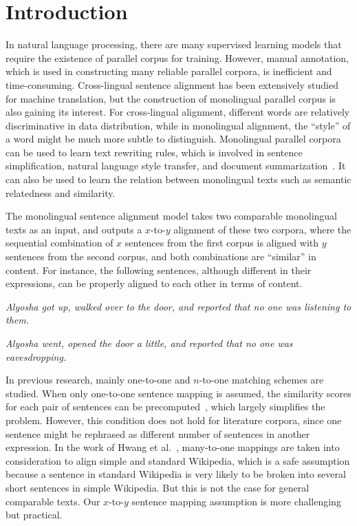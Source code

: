 \section{Introduction}
\label{sec:intro}

In natural language processing, there are many supervised learning models that require the existence of parallel corpus for training. However, manual annotation, which is used in constructing many reliable parallel corpora, is inefficient and time-consuming. Cross-lingual sentence alignment has been extensively studied for machine translation, but the construction of monolingual parallel corpus is also gaining its interest. For cross-lingual alignment, different words are relatively discriminative in data distribution, while in monolingual alignment, the ``style'' of a word might be much more subtle to distinguish. Monolingual parallel corpora can be used to learn text rewriting rules, which is involved in sentence simplification, natural language style transfer, and document summarization~\cite{hwang2015aligning}. It can also be used to learn the relation between monolingual texts such as semantic relatedness and similarity.

The monolingual sentence alignment model takes two comparable monolingual texts as an input, and outputs a $x$-to-$y$ alignment of these two corpora, where the sequential combination of $x$ sentences from the first corpus is aligned with $y$ sentences from the second corpus, and both combinations are ``similar'' in content. For instance, the following sentences, although different in their expressions, can be properly aligned to each other in terms of content.

\emph{Alyosha got up, walked over to the door, and reported that no one was listening to them.}

\emph{Alyosha went, opened the door a little, and reported that no one was eavesdropping.}

In previous research, mainly one-to-one and $n$-to-one matching schemes are studied. When only one-to-one sentence mapping is assumed, the similarity scores for each pair of sentences can be precomputed~\cite{kajiwara2016building}, which largely simplifies the problem. However, this condition does not hold for literature corpora, since one sentence might be rephrased as different number of sentences in another expression. In the work of Hwang et al.~, many-to-one mappings are taken into consideration to align simple and standard Wikipedia, which is a safe assumption because a sentence in standard Wikipedia is very likely to be broken into several short sentences in simple Wikipedia. But this is not the case for general comparable texts. Our $x$-to-$y$ sentence mapping assumption is more challenging but practical.

